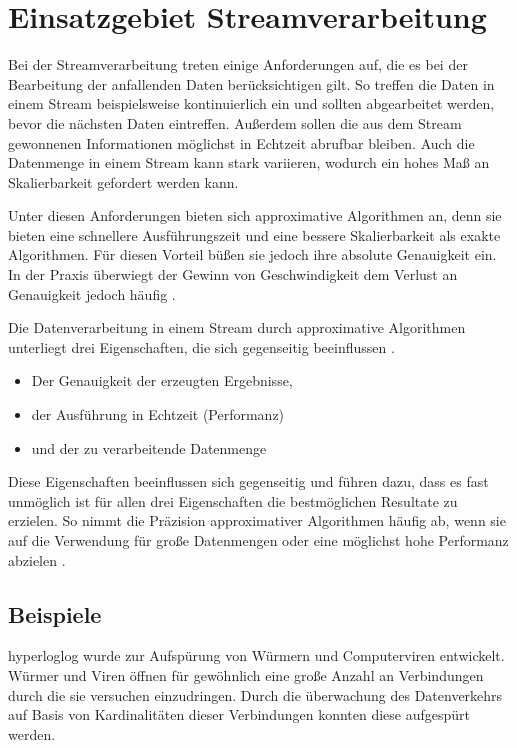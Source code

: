 \section{Einsatzgebiet Streamverarbeitung}
Bei der Streamverarbeitung treten einige Anforderungen auf, 
die es bei der Bearbeitung der anfallenden Daten berücksichtigen gilt. 
So treffen die Daten in einem Stream beispielsweise kontinuierlich ein und sollten abgearbeitet werden,
bevor die nächsten Daten eintreffen. 
Außerdem sollen die aus dem Stream gewonnenen Informationen möglichst in Echtzeit abrufbar bleiben.
Auch die Datenmenge in einem Stream kann stark variieren, wodurch ein hohes Maß an Skalierbarkeit gefordert werden kann.

Unter diesen Anforderungen bieten sich approximative Algorithmen an, denn sie bieten eine schnellere Ausführungszeit und eine bessere Skalierbarkeit als exakte Algorithmen. 
Für diesen Vorteil büßen sie jedoch ihre absolute Genauigkeit ein. 
In der Praxis überwiegt der Gewinn von Geschwindigkeit dem Verlust an Genauigkeit jedoch häufig \cite{Maas2019}. 

Die Datenverarbeitung in einem Stream durch approximative Algorithmen unterliegt drei Eigenschaften, 
die sich gegenseitig beeinflussen \cite{Maas2019}. 

\begin{itemize}
\item
Der Genauigkeit der erzeugten Ergebnisse,
\item
der Ausführung in Echtzeit (Performanz)
\item
und der zu verarbeitende Datenmenge
\end{itemize}

Diese Eigenschaften beeinflussen sich gegenseitig und führen dazu, 
dass es fast unmöglich ist für allen drei Eigenschaften die bestmöglichen Resultate zu erzielen.
So nimmt die Präzision approximativer Algorithmen häufig ab, 
wenn sie auf die Verwendung für große Datenmengen oder eine möglichst hohe Performanz abzielen \cite{Maas2019}.

\subsection{Beispiele}
hyperloglog wurde zur Aufspürung von Würmern und Computerviren entwickelt. 
Würmer und Viren öffnen für gewöhnlich eine große Anzahl an Verbindungen durch die sie versuchen einzudringen. 
Durch die überwachung des Datenverkehrs auf Basis von Kardinalitäten dieser Verbindungen konnten diese aufgespürt werden. \cite{flajolet2007}